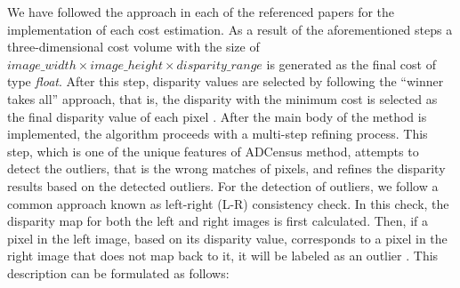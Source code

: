 We have followed the approach in each of the referenced papers for the implementation of each cost estimation. As a result of the aforementioned steps
a three-dimensional cost volume with the size of $image\_width\times image\_height\times disparity\_range $ is generated as the final cost of type \textit{float}.
After this step, disparity values are selected by following the ``winner takes all'' approach, that is, the disparity with the minimum cost is
selected as the final disparity value of each pixel \cite{sch02}.
After the main body of the method is implemented, the algorithm proceeds with a multi-step refining process. This step, which is one of the unique features
of ADCensus method, attempts to detect the outliers, that is the wrong matches of pixels, and refines the disparity results based on the detected outliers.
For the detection of outliers, we follow a common approach  
known as left-right (L-R) consistency check. In this check, the disparity map for both
the left and right images is first calculated. Then, if a pixel in the left image, based on its disparity value, corresponds to a pixel in the right image
that does not map back to it, it will be labeled as an outlier \cite{mei11}. This description can be formulated as follows:


